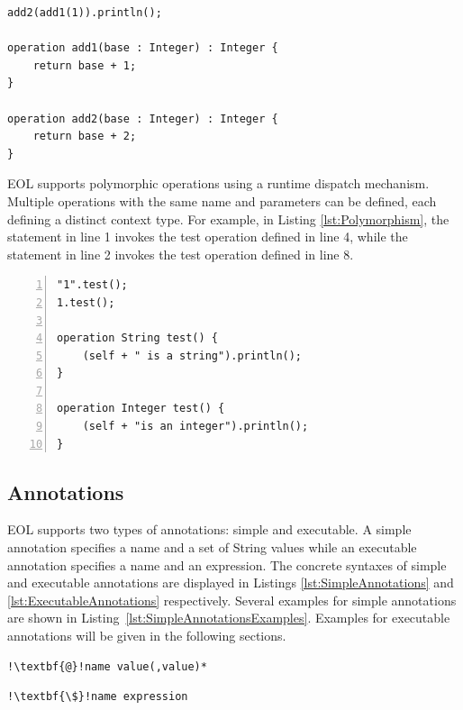 \begin{lstlisting}[float=tbp, caption={Context-less EOL operations}, label=lst:OperationsNoContext, language=EOL]
add2(add1(1)).println();

operation add1(base : Integer) : Integer {
	return base + 1;
}

operation add2(base : Integer) : Integer {
	return base + 2;
}
\end{lstlisting}

EOL supports polymorphic operations using a runtime dispatch mechanism. Multiple operations with the same name and parameters can be defined, each defining a distinct context type. For example, in Listing \ref{lst:Polymorphism}, the statement in line 1 invokes the test operation defined in line 4, while the statement in line 2 invokes the test operation defined in line 8.

\begin{lstlisting}[float=tbp, caption=Demonstration of polymorphism in EOL, label=lst:Polymorphism, numbers=left, language=EOL]
"1".test();
1.test();

operation String test() {
	(self + " is a string").println();
}

operation Integer test() {
	(self + "is an integer").println();
}

\end{lstlisting}

\subsection{Annotations}
\label{sec:Design.EOL.Annotations}
EOL supports two types of annotations: simple and executable. A simple annotation specifies a name and a set of String values while an executable annotation specifies a name and an expression. The concrete syntaxes of simple and executable annotations are displayed in Listings \ref{lst:SimpleAnnotations} and \ref{lst:ExecutableAnnotations} respectively. Several examples for simple annotations are shown in Listing~\ref{lst:SimpleAnnotationsExamples}. Examples for executable annotations will be given in the following sections.

\begin{lstlisting}[float=tbp, caption=Concrete syntax of simple annotations, label=lst:SimpleAnnotations, language=EOL, escapechar=!]
!\textbf{@}!name value(,value)*
\end{lstlisting}

\begin{lstlisting}[float=tbp, caption=Concrete syntax of executable annotations, label=lst:ExecutableAnnotations, language=EOL, escapechar=!]
!\textbf{\$}!name expression
\end{lstlisting}

